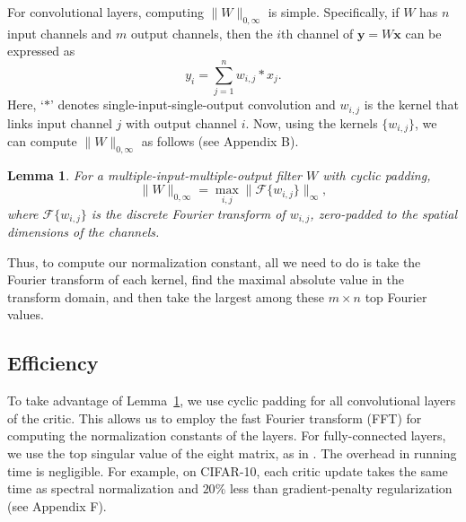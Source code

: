 \documentclass[letterpaper]{article} %
\newtheorem{lemma}{Lemma}
\begin{document}
For convolutional layers, computing $\|W\|_{0,\infty}$ is simple. Specifically, if $W$ has $n$ input channels and $m$ output channels, then the $i$th channel of $\boldsymbol{y}=W\boldsymbol{x}$ can be expressed as
\begin{equation}
y_i = \sum_{j=1}^n w_{i,j}*x_j.
\end{equation}
Here, `$*$' denotes single-input-single-output convolution and $w_{i,j}$ is the kernel that links input channel $j$ with output channel $i$. Now, using the kernels $\{w_{i,j}\}$, we can compute $\|W\|_{0,\infty}$ as follows  (see Appendix B).

\begin{lemma}\label{lem:SparseNorm}
	For a multiple-input-multiple-output filter $W$ with cyclic padding, 
\begin{equation}
\|W\|_{0,\infty} = \max_{i,j}\|\mathcal{F}\{w_{i,j}\}\|_\infty,
\label{eq:lemma}
\end{equation}
where $\mathcal{F}\{w_{i,j}\}$ is the discrete Fourier transform of $w_{i,j}$, zero-padded to the spatial dimensions of the channels.
\end{lemma}

Thus, to compute our normalization constant, all we need to do is take the Fourier transform of each kernel, find the maximal absolute value in the transform domain, and then take the largest among these $m\times n$ top Fourier values.


\subsection{Efficiency}

To take advantage of Lemma~\ref{lem:SparseNorm}, we use cyclic padding for all convolutional layers of the critic. This allows us to employ the fast Fourier transform (FFT) for computing the normalization constants of the layers. For  fully-connected layers, we use the top singular value of the eight matrix, as in \cite{spectral}. The overhead in running time is negligible. For example, on CIFAR-10, each critic update takes the same time as spectral normalization and $20\%$ less than gradient-penalty regularization (see Appendix F).
\end{document}
